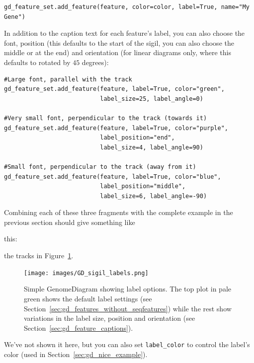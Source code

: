 \documentclass{report}
\begin{document}
\begin{verbatim}
gd_feature_set.add_feature(feature, color=color, label=True, name="My Gene")
\end{verbatim}

In addition to the caption text for each feature's label, you can also choose
the font, position (this defaults to the start of the sigil, you can also
choose the middle or at the end) and orientation (for linear diagrams only,
where this defaults to rotated by $45$ degrees):

\begin{verbatim}
#Large font, parallel with the track
gd_feature_set.add_feature(feature, label=True, color="green",
                           label_size=25, label_angle=0)

#Very small font, perpendicular to the track (towards it)
gd_feature_set.add_feature(feature, label=True, color="purple",
                           label_position="end",
                           label_size=4, label_angle=90)

#Small font, perpendicular to the track (away from it)
gd_feature_set.add_feature(feature, label=True, color="blue",
                           label_position="middle",
                           label_size=6, label_angle=-90)
\end{verbatim}

\noindent Combining each of these three fragments with the complete example
in the previous section should give something like
\begin{htmlonly}
this:

\label{fig:gd_sigil_labels}

\end{htmlonly}
\begin{latexonly}
the tracks in Figure~\ref{fig:gd_sigil_labels}.
\begin{figure}[htbp]
\centering
\texttt{[image: images/GD\_sigil\_labels.png]}
\caption{Simple GenomeDiagram showing label options.
The top plot in pale green shows the default label settings (see
Section~\ref{sec:gd_features_without_seqfeatures}) while the rest show
variations in the label size, position and orientation (see
Section~\ref{sec:gd_feature_captions}).
}
\label{fig:gd_sigil_labels}
\end{figure}
\end{latexonly}

We've not shown it here, but you can also set \texttt{label\_color} to
control the label's color (used in Section~\ref{sec:gd_nice_example}).
\end{document}
